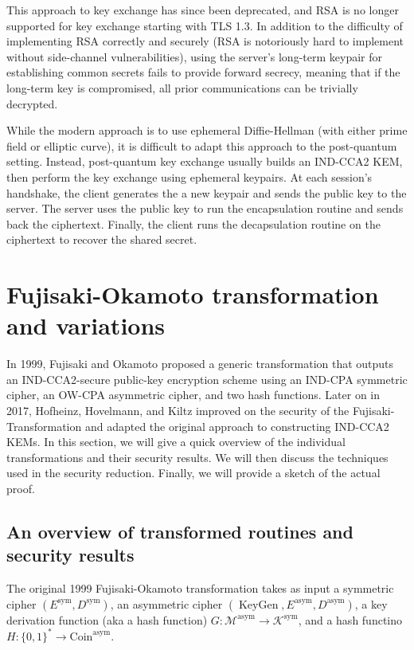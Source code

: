 \documentclass{article}
\begin{document}
    This approach to key exchange has since been deprecated, and RSA is no longer supported for key exchange starting with TLS 1.3. In addition to the difficulty of implementing RSA correctly and securely (RSA is notoriously hard to implement without side-channel vulnerabilities), using the server's long-term keypair for establishing common secrets fails to provide forward secrecy, meaning that if the long-term key is compromised, all prior communications can be trivially decrypted.

    While the modern approach is to use ephemeral Diffie-Hellman (with either prime field or elliptic curve), it is difficult to adapt this approach to the post-quantum setting. Instead, post-quantum key exchange usually builds an IND-CCA2 KEM, then perform the key exchange using ephemeral keypairs. At each session's handshake, the client generates the a new keypair and sends the public key to the server. The server uses the public key to run the encapsulation routine and sends back the ciphertext. Finally, the client runs the decapsulation routine on the ciphertext to recover the shared secret.

\section{Fujisaki-Okamoto transformation and variations}
In 1999, Fujisaki and Okamoto \cite{fujisaki1999secure} proposed a generic transformation that outputs an IND-CCA2-secure public-key encryption scheme using an IND-CPA symmetric cipher, an OW-CPA asymmetric cipher, and two hash functions. Later on in 2017, Hofheinz, Hovelmann, and Kiltz \cite{hofheinz2017modular} improved on the security of the Fujisaki-Transformation and adapted the original approach to constructing IND-CCA2 KEMs. In this section, we will give a quick overview of the individual transformations and their security results. We will then discuss the techniques used in the security reduction. Finally, we will provide a sketch of the actual proof.

\subsection{An overview of transformed routines and security results}
The original 1999 Fujisaki-Okamoto transformation takes as input a symmetric cipher $(E^\text{sym}, D^\text{sym})$, an asymmetric cipher $(\operatorname{KeyGen}, E^\text{asym}, D^\text{asym})$, a key derivation function (aka a hash function) $G: \mathcal{M}^\text{asym} \rightarrow \mathcal{K}^\text{sym}$, and a hash functino $H: \{0, 1\}^\ast \rightarrow \text{Coin}^\text{asym}$.
\end{document}

